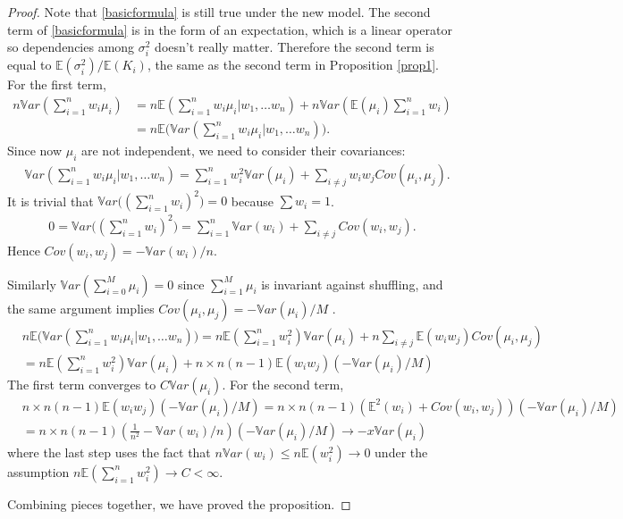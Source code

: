 \documentclass[12pt,letterpaper]{article}
\newcommand{\var}{\ensuremath{\mathbb Var}}
\newcommand{\bbe}{\mathbb{E}}
\begin{document}
\begin{proof}
Note that \eqref{basicformula} is still true under the new model. The second term of \eqref{basicformula} is in the form of an expectation, which is a linear operator so dependencies among $\sigma_i^2$ doesn't really matter. Therefore the second term is equal to $\bbe(\sigma_i^2)/\bbe(K_i)$, the same as the second term in Proposition \ref{prop1}. 
For the first term, 
\begin{align*}
n\var (\sum_{i=1}^n w_i \mu_i) &= n\bbe (\sum_{i=1}^n w_i \mu_i| w_1,\dots w_n) + n\var( \bbe(\mu_i)\sum_{i=1}^n w_i)\\
&  =  n\bbe \bigl(\var(\sum_{i=1}^n w_i \mu_i| w_1,\dots w_n) \bigr).
\end{align*}
Since now $\mu_i$ are not independent, we need to consider their covariances:
\begin{align*}
&\var(\sum_{i=1}^n w_i \mu_i| w_1,\dots w_n) = \sum_{i=1}^nw_i^2 \var(\mu_i) + \sum_{i\neq j} w_i w_j Cov(\mu_i,\mu_j).
\end{align*}
It is trivial that $\var \bigl((\sum_{i=1}^n w_i)^2\bigr) =0$ because $\sum w_i =1$. 
\begin{align*}
0 = \var \bigl((\sum_{i=1}^n w_i)^2\bigr) = \sum_{i=1}^n \var(w_i) + \sum_{i\neq j} Cov(w_i,w_j). 
\end{align*}
Hence $Cov(w_i,w_j)=-\var(w_i)/n$.

Similarly $\var(\sum_{i=0}^M \mu_i) = 0$ since $\sum_{i=1}^M \mu_i$ is invariant against shuffling, and the same argument implies $Cov(\mu_i,\mu_j) = - \var(\mu_i)/M$ . 
\begin{align*}
&n\bbe \bigl(\var(\sum_{i=1}^n w_i \mu_i| w_1,\dots w_n) \bigr)= n\bbe(\sum_{i=1}^nw_i^2)\var(\mu_i) + n \sum_{i\neq j} \bbe(w_i w_j) Cov(\mu_i,\mu_j)\\
&= n\bbe(\sum_{i=1}^nw_i^2)\var(\mu_i) + n\times n(n-1)\bbe(w_i w_j) (-\var(\mu_i)/M) 
\end{align*}
The first term converges to $C \var(\mu_i)$. For the second term, 
\begin{align*}
&n\times n(n-1)\bbe(w_i w_j) (-\var(\mu_i)/M) = n\times n(n-1)(\bbe^2(w_i)+Cov(w_i,w_j)) (-\var(\mu_i)/M)\\
&= n\times n(n-1)(\frac{1}{n^2}-\var(w_i)/n)(-\var(\mu_i)/M)\to - x \var (\mu_i)
\end{align*}
where the last step uses the fact that $n\var(w_i)\le n\bbe(w_i^2)\to 0$ under the assumption $n\bbe(\sum_{i=1}^nw_i^2)\to C<\infty$.

Combining pieces together, we have proved the proposition.
\end{proof}
\end{document}
